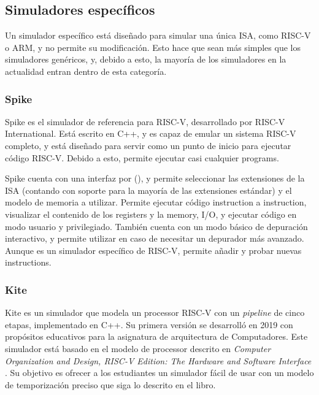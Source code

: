 \subsection{Simuladores específicos}

Un simulador específico está diseñado para simular una única \gls{ISA}, como
RISC-V o ARM, y no permite su modificación. Esto hace que sean más simples que
los simuladores genéricos, y, debido a esto, la mayoría de los simuladores en la
actualidad entran dentro de esta categoría.

\subsubsection{Spike}

Spike \parencite{spike} es el simulador de referencia para RISC-V, desarrollado
por RISC-V International. Está escrito en C++, y es capaz de emular un sistema RISC-V completo, y está
diseñado para servir como un punto de inicio para ejecutar código RISC-V. Debido
a esto, permite ejecutar casi cualquier \glspl{program}.

Spike cuenta con una interfaz por 
(), y permite seleccionar las extensiones de la \gls{ISA}
(contando con soporte para la mayoría de las extensiones estándar) y el modelo
de memoria a utilizar. Permite ejecutar código \gls{instruction} a
\gls{instruction}, visualizar el contenido de los \glspl{register} y la
\gls{memory}, I/O, y ejecutar código en modo usuario y privilegiado. También cuenta
con un modo básico de depuración interactivo, y permite utilizar 
en caso de necesitar un depurador más avanzado. Aunque es un simulador
específico de RISC-V, permite añadir y probar nuevas \glspl{instruction}.


\subsubsection{Kite}

Kite \parencite{kite} \parencite{kite-gh} es un simulador que modela un
\gls{processor} RISC-V con un \textit{pipeline} de cinco etapas, implementado en
C++. Su primera versión se desarrolló en 2019 con propósitos educativos para la
asignatura de arquitectura de Computadores. Este simulador está basado en el
modelo de \gls{processor} descrito en \textit{Computer Organization and Design,
RISC-V Edition: The Hardware and Software Interface} \parencite{kite-book}. Su
objetivo es ofrecer a los estudiantes un simulador fácil de usar con un modelo
de temporización preciso que siga lo descrito en el libro.

